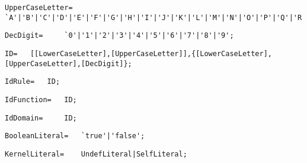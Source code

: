 \documentclass{article}
\begin{document}
    \begin{flushleft}
    \begin{lstlisting}[mathescape=true, breaklines=true]
      UpperCaseLetter= 	`A'|'B'|'C'|'D'|'E'|'F'|'G'|'H'|'I'|'J'|'K'|'L'|'M'|'N'|'O'|'P'|'Q'|'R'|'S'|'T'|'U'|'V'|'W'|'X'|'Y'|'Z';
    \end{lstlisting}
    \end{flushleft}
    \begin{flushleft}
    \begin{lstlisting}[mathescape=true, breaklines=true]
      DecDigit= 	`0'|'1'|'2'|'3'|'4'|'5'|'6'|'7'|'8'|'9';
    \end{lstlisting}
    \end{flushleft}
    \begin{flushleft}
    \begin{lstlisting}[mathescape=true, breaklines=true]
      ID= 	[[LowerCaseLetter],[UpperCaseLetter]],{[LowerCaseLetter],[UpperCaseLetter],[DecDigit]};
    \end{lstlisting}
    \end{flushleft}
    \begin{flushleft}
    \begin{lstlisting}[mathescape=true, breaklines=true]
      IdRule= 	ID;
    \end{lstlisting}
    \end{flushleft}
    \begin{flushleft}
    \begin{lstlisting}[mathescape=true, breaklines=true]
      IdFunction= 	ID;
    \end{lstlisting}
    \end{flushleft}
    \begin{flushleft}
    \begin{lstlisting}[mathescape=true, breaklines=true]
      IdDomain= 	ID;
    \end{lstlisting}
    \end{flushleft}
    \begin{flushleft}
    \begin{lstlisting}[mathescape=true, breaklines=true]
      BooleanLiteral= 	`true'|'false';
    \end{lstlisting}
    \end{flushleft}
    \begin{flushleft}
    \begin{lstlisting}[mathescape=true, breaklines=true]
      KernelLiteral= 	UndefLiteral|SelfLiteral;
    \end{lstlisting}
    \end{flushleft}
\end{document}
